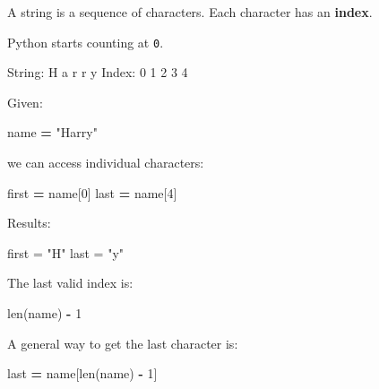 \documentclass[
]{article}
\newenvironment{Shaded}{\begin{snugshade}}{\end{snugshade}}
\newcommand{\BuiltInTok}[1]{#1}
\newcommand{\DecValTok}[1]{\textcolor[rgb]{0.00,0.00,0.81}{#1}}
\newcommand{\NormalTok}[1]{#1}
\newcommand{\OperatorTok}[1]{\textcolor[rgb]{0.81,0.36,0.00}{\textbf{#1}}}
\newcommand{\StringTok}[1]{\textcolor[rgb]{0.31,0.60,0.02}{#1}}
\begin{document}
A string is a sequence of characters. Each character has an
\textbf{index}.

Python starts counting at \texttt{0}.

\begin{Shaded}
\begin{Highlighting}[]
\NormalTok{String:  H  a  r  r  y}
\NormalTok{Index:   0  1  2  3  4}
\end{Highlighting}
\end{Shaded}

Given:

\begin{Shaded}
\begin{Highlighting}[]
\NormalTok{name }\OperatorTok{=} \StringTok{"Harry"}
\end{Highlighting}
\end{Shaded}

we can access individual characters:

\begin{Shaded}
\begin{Highlighting}[]
\NormalTok{first }\OperatorTok{=}\NormalTok{ name[}\DecValTok{0}\NormalTok{]}
\NormalTok{last }\OperatorTok{=}\NormalTok{ name[}\DecValTok{4}\NormalTok{]}
\end{Highlighting}
\end{Shaded}

Results:

\begin{Shaded}
\begin{Highlighting}[]
\NormalTok{first = "H"}
\NormalTok{last  = "y"}
\end{Highlighting}
\end{Shaded}

The last valid index is:

\begin{Shaded}
\begin{Highlighting}[]
\BuiltInTok{len}\NormalTok{(name) }\OperatorTok{{-}} \DecValTok{1}
\end{Highlighting}
\end{Shaded}

A general way to get the last character is:

\begin{Shaded}
\begin{Highlighting}[]
\NormalTok{last }\OperatorTok{=}\NormalTok{ name[}\BuiltInTok{len}\NormalTok{(name) }\OperatorTok{{-}} \DecValTok{1}\NormalTok{]}
\end{Highlighting}
\end{Shaded}
\end{document}
